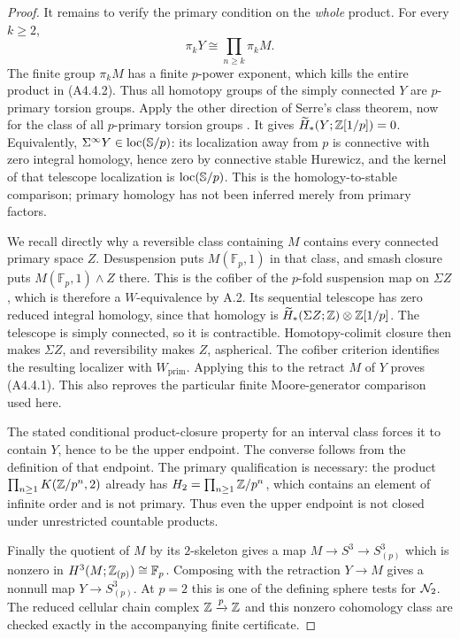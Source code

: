\begin{proof}
It remains to verify the primary condition on the \emph{whole}
product.  For every $k\geq2$,
\[
       \pi_kY\cong\prod_{n\geq k}\pi_kM.
 \tag{A4.4.2}
\]
The finite group $\pi_kM$ has a finite $p$-power exponent, which
kills the entire product in \textup{(A4.4.2)}.  Thus all homotopy
groups of the simply connected $Y$ are $p$-primary torsion groups.
Apply the other direction of Serre's class theorem, now for the class
of all $p$-primary torsion groups
\citep[Chapter I, \S7.2; Chapter III, Theorem 1]{A4SerreClasses}.
It gives $\widetilde H_*(Y;\mathbb Z[1/p])=0$.  Equivalently,
$\Sigma^\infty Y\in\operatorname{loc}(\mathbb S/p)$: its localization away
from $p$ is connective with zero integral homology, hence zero by
connective stable Hurewicz, and the kernel of that telescope
localization is $\operatorname{loc}(\mathbb S/p)$.  This is the homology-to-stable
comparison; primary homology has not been inferred merely from
primary factors.

We recall directly why a reversible class containing $M$ contains
every connected primary space $Z$.  Desuspension puts
$M(\mathbb F_p,1)$ in that class, and smash closure puts
$M(\mathbb F_p,1)\wedge Z$ there.  This is the cofiber of the
$p$-fold suspension map on $\Sigma Z$, which is therefore a
$W$-equivalence by A.2.  Its sequential telescope has zero reduced
integral homology, since that homology is
$\widetilde H_*(\Sigma Z;\mathbb Z)\otimes\mathbb Z[1/p]$.  The telescope is
simply connected, so it is contractible.  Homotopy-colimit closure
then makes $\Sigma Z$, and reversibility makes $Z$, aspherical.
The cofiber criterion identifies the resulting localizer with
$W_{\mathrm{prim}}$.  Applying this to the retract $M$ of $Y$
proves \textup{(A4.4.1)}.  This also reproves the particular finite
Moore-generator comparison used here.

The stated conditional product-closure property for an interval
class forces it to contain $Y$, hence to be the upper endpoint.
The converse follows from the definition of that endpoint.  The
primary qualification is necessary: the product
$\prod_{n\geq1}K(\mathbb Z/p^n,2)$ already has
$H_2=\prod_{n\geq1}\mathbb Z/p^n$, which contains an element of infinite
order and is not primary.  Thus even the upper endpoint is not
closed under unrestricted countable products.

Finally the quotient of $M$ by its $2$-skeleton gives a map
$M\to S^3\to S^3_{(p)}$ which is nonzero in
$H^3(M;\mathbb Z_{(p)})\cong\mathbb F_p$.  Composing with the retraction
$Y\to M$ gives a nonnull map $Y\to S^3_{(p)}$.  At $p=2$ this is
one of the defining sphere tests for $\mathcal N_2$.  The reduced cellular
chain complex $\mathbb Z\xrightarrow{p}\mathbb Z$ and this nonzero cohomology
class are checked exactly in the accompanying finite certificate.
\end{proof}

